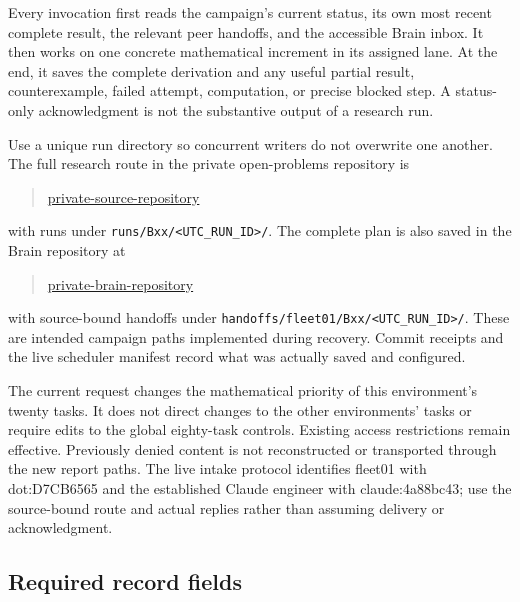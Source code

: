 \documentclass[11pt]{article}
\begin{document}
Every invocation first reads the campaign's current status, its own most recent complete result, the relevant peer handoffs, and the accessible Brain inbox. It then works on one concrete mathematical increment in its assigned lane. At the end, it saves the complete derivation and any useful partial result, counterexample, failed attempt, computation, or precise blocked step. A status-only acknowledgment is not the substantive output of a research run.

Use a unique run directory so concurrent writers do not overwrite one another. The full research route in the private open-problems repository is
\begin{quote}\small
\url{private-source-repository}
\end{quote}
with runs under \texttt{runs/Bxx/<UTC\_RUN\_ID>/}. The complete plan is also saved in the Brain repository at
\begin{quote}\small
\url{private-brain-repository}
\end{quote}
with source-bound handoffs under \texttt{handoffs/fleet01/Bxx/<UTC\_RUN\_ID>/}. These are intended campaign paths implemented during recovery. Commit receipts and the live scheduler manifest record what was actually saved and configured.

The current request changes the mathematical priority of this environment's twenty tasks. It does not direct changes to the other environments' tasks or require edits to the global eighty-task controls. Existing access restrictions remain effective. Previously denied content is not reconstructed or transported through the new report paths. The live intake protocol identifies fleet01 with dot:D7CB6565 and the established Claude engineer with claude:4a88bc43; use the source-bound route and actual replies rather than assuming delivery or acknowledgment.

\subsection{Required record fields}
\end{document}
